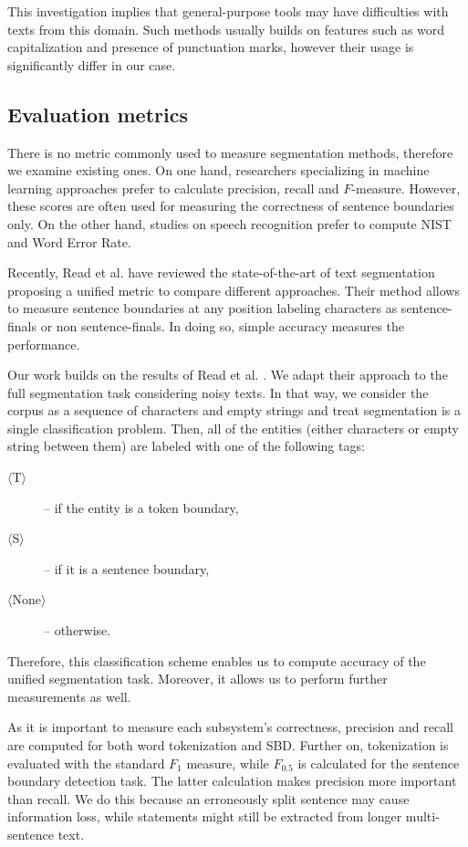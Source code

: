 This investigation implies that general-purpose tools may have difficulties with texts from this domain. 
Such methods usually builds on features such as word capitalization and presence of punctuation marks, however their usage is significantly differ in our case. 

\subsection{Evaluation metrics}
\label{sec:metric}

There is no metric commonly used to measure segmentation methods, therefore we examine existing ones.
On one hand, researchers specializing in machine learning approaches prefer to calculate precision, recall and $F$-measure. 
However, these scores are often used for measuring the correctness of sentence boundaries only.
On the other hand, studies on speech recognition prefer to compute NIST and Word Error Rate. 

Recently, Read et al. have reviewed \cite{read2012sentence} the state-of-the-art of text segmentation proposing a unified metric to compare different approaches. 
Their method allows to measure sentence boundaries at any position labeling characters as sentence-finals or non sentence-finals. 
In doing so, simple accuracy measures the performance. 

Our work builds on the results of Read et al. \cite{read2012sentence}. 
We adapt their approach to the full segmentation task considering noisy texts. 
In that way, we consider the corpus as a sequence of characters and empty strings and treat segmentation is a single classification problem. 
Then, all of the entities (either characters or empty string between them) are labeled with one of the following tags: 
\begin{description}
 \item[$\langle$T$\rangle$] --  if the entity is a token boundary,
 \item[$\langle$S$\rangle$] -- if it is a sentence boundary,
 \item[$\langle$None$\rangle$] -- otherwise.
\end{description}
Therefore, this classification scheme enables us to compute accuracy of the unified segmentation task. 
Moreover, it allows us to perform further measurements as well.

As it is important to measure each subsystem's correctness, precision and recall are computed for both word tokenization and SBD. 
Further on, tokenization is evaluated with the standard $F_1$ measure, while $F_{0.5}$ is calculated for the sentence boundary detection task. 
The latter calculation makes precision more important than recall.%
We do this because an erroneously split sentence may cause information loss\label{sec:loss}, while statements might still be extracted from longer multi-sentence text. 

